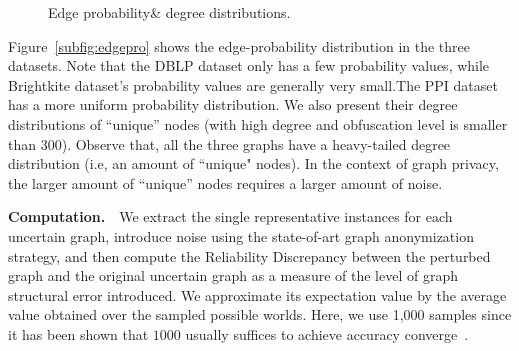\begin{figure}[!htb]
    \vspace{-10pt}
    \caption{Edge probability\& degree distributions.}
    \label{fig:summary_graph}
   \vspace{-15pt}
\end{figure}

Figure~\ref{subfig:edgepro} shows the edge-probability distribution in the three datasets. 
Note that the DBLP dataset only has  a few probability values, while Brightkite dataset's probability values are generally very small.The PPI dataset has a more uniform probability distribution. 
We also present their degree distributions of ``unique'' nodes (with high degree and obfuscation level is smaller than $300$). Observe that, all the three graphs have a heavy-tailed degree distribution (i.e, an amount of ``unique" nodes). In the context of graph privacy, the larger amount of ``unique'' nodes requires a larger amount of noise.


\textbf{Computation.}~~We extract the single representative instances for each uncertain graph, introduce noise using the state-of-art graph anonymization strategy, and then compute the Reliability Discrepancy between the perturbed graph and the original uncertain graph as a measure of the level of graph structural error introduced. We approximate its expectation value by the average value obtained over the sampled possible worlds. Here, we use 1,000 samples since it has been shown that $1000$ usually suffices to achieve accuracy converge~\cite{Potamias_K_2010}.

